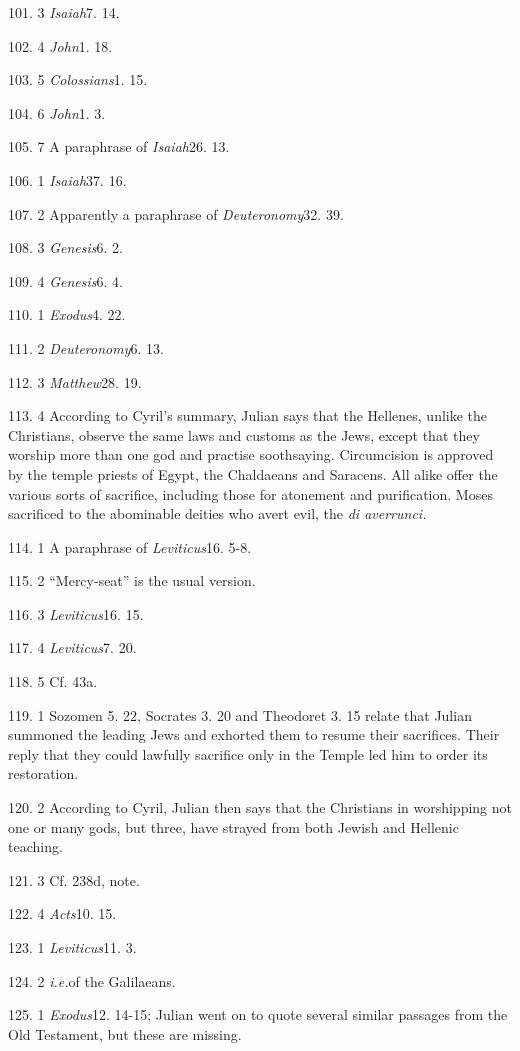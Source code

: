 101. 3 \emph{Isaiah}7. 14.

102. 4 \emph{John}1. 18.

103. 5 \emph{Colossians}1. 15.

104. 6 \emph{John}1. 3.

105. 7 A paraphrase of \emph{Isaiah}26. 13.

106. 1 \emph{Isaiah}37. 16.

107. 2 Apparently a paraphrase of \emph{Deuteronomy}32. 39.

108. 3 \emph{Genesis}6. 2.

109. 4 \emph{Genesis}6. 4.

110. 1 \emph{Exodus}4. 22.

111. 2 \emph{Deuteronomy}6. 13.

112. 3 \emph{Matthew}28. 19.

113. 4 According to Cyril's summary, Julian says that the Hellenes, unlike the Christians, observe the same laws and customs as the Jews, except that they worship more than one god and practise soothsaying. Circumcision is approved by the temple priests of Egypt, the Chaldaeans and Saracens. All alike offer the various sorts of sacrifice, including those for atonement and purification. Moses sacrificed to the abominable deities who avert evil, the \emph{di averrunci.}

114. 1 A paraphrase of \emph{Leviticus}16. 5-8.

115. 2 ``Mercy-seat'' is the usual version.

116. 3 \emph{Leviticus}16. 15.

117. 4 \emph{Leviticus}7. 20.

118. 5 Cf. 43a.

119. 1 Sozomen 5. 22, Socrates 3. 20 and Theodoret 3. 15 relate that Julian summoned the leading Jews and exhorted them to resume their sacrifices. Their reply that they could lawfully sacrifice only in the Temple led him to order its restoration.

120. 2 According to Cyril, Julian then says that the Christians in worshipping not one or many gods, but three, have strayed from both Jewish and Hellenic teaching.

121. 3 Cf. 238d, note.

122. 4 \emph{Acts}10. 15.

123. 1 \emph{Leviticus}11. 3.

124. 2 \emph{i.e.}of the Galilaeans.

125. 1 \emph{Exodus}12. 14-15; Julian went on to quote several similar passages from the Old Testament, but these are missing.

